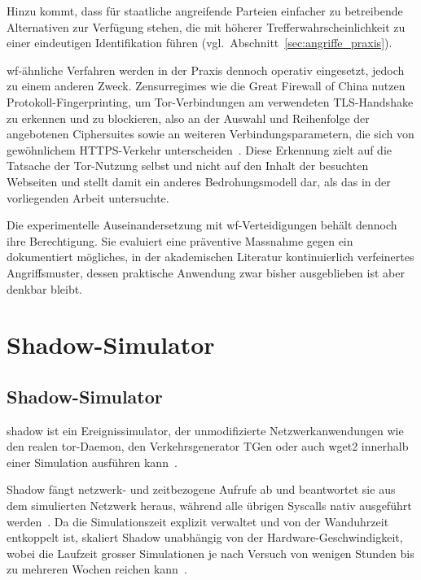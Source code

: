 Hinzu kommt, dass für staatliche angreifende Parteien einfacher zu betreibende Alternativen zur Verfügung stehen, die mit höherer Trefferwahrscheinlichkeit zu einer eindeutigen Identifikation führen (vgl.\ Abschnitt~\ref{sec:angriffe_praxis}).

\gls{wf}-ähnliche Verfahren werden in der Praxis dennoch operativ eingesetzt, jedoch zu einem anderen Zweck.
Zensurregimes wie die Great Firewall of China nutzen Protokoll-Fingerprinting, um Tor-Verbindungen am verwendeten TLS-Handshake zu erkennen und zu blockieren, also an der Auswahl und Reihenfolge der angebotenen Ciphersuites sowie an weiteren Verbindungsparametern, die sich von gewöhnlichem HTTPS-Verkehr unterscheiden~\cite{winter2012china}.
Diese Erkennung zielt auf die Tatsache der Tor-Nutzung selbst und nicht auf den Inhalt der besuchten Webseiten und stellt damit ein anderes Bedrohungsmodell dar, als das in der vorliegenden Arbeit untersuchte.

Die experimentelle Auseinandersetzung mit \gls{wf}-Verteidigungen behält dennoch ihre Berechtigung.
Sie evaluiert eine präventive Massnahme gegen ein dokumentiert mögliches, in der akademischen Literatur kontinuierlich verfeinertes Angriffsmuster, dessen praktische Anwendung zwar bisher ausgeblieben ist aber denkbar bleibt.





\section{Shadow-Simulator}

\subsection{Shadow-Simulator}

\gls{shadow} ist ein Ereignissimulator, der unmodifizierte Netzwerkanwendungen wie den realen \gls{tor}-Daemon, den Verkehrsgenerator TGen oder auch wget2 innerhalb einer Simulation ausführen kann~\cite{netsim-atc2022}.


Shadow fängt netzwerk- und zeitbezogene Aufrufe ab und beantwortet sie aus dem simulierten Netzwerk heraus, während alle übrigen Syscalls nativ ausgeführt werden~\cite{jansen2011shadow}.
Da die Simulationszeit explizit verwaltet und von der Wanduhrzeit entkoppelt ist, skaliert Shadow unabhängig von der Hardware-Geschwindigkeit, wobei die Laufzeit grosser Simulationen je nach Versuch von wenigen Stunden bis zu mehreren Wochen reichen kann~\cite{neverenough-sec2021}.

